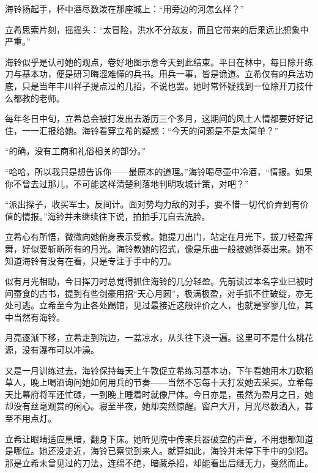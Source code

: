 \documentclass{article}
\begin{document}
海铃扬起手，杯中酒尽数泼在那座城上：“用旁边的河怎么样？”



立希思索片刻，摇摇头：“太冒险，洪水不分敌友，而且它带来的后果远比想象中严重。”



海铃似乎是认可她的观点，卷好地图示意今天到此结束。平日在林中，每日除开练刀与基本功，便是研习晦涩难懂的兵书。用兵一事，皆是诡道。立希仅有的兵法功底，只是当年丰川祥子提点过的几招，不说也罢。她时常怀疑找到一位除开刀技什么都教的老师。



每年冬日中旬，立希总会被打发出去游历三个多月，这期间的风土人情都要好好记住，一一汇报给她。海铃看穿立希的疑惑：“今天的问题是不是太简单？”



“的确，没有工商和礼俗相关的部分。”



“哈哈，所以我只是想告诉你——最原本的道理。”海铃喝尽壶中冷酒，“情报。如果你不曾去过那儿，不可能这样清楚利落地判明攻城计策，对吧？”



“派出探子，收买军士，反间计。面对势均力敌的对手，要不惜一切代价弄到有价值的情报。”海铃并未继续往下说，拍拍手兀自去洗脸。



立希心有所悟，微微向她俯身表示受教。她提刀出门，站定在月光下，拔刀轻盈挥舞，好似要斩断所有的月光。海铃教她的招式，像是乐曲一般被她弹奏出来。她不知道海铃有没有在看，只是专注于手中的刀。



似有月光相助，今日挥刀时总觉得抓住海铃的几分轻盈。先前读过本名字业已被时间蚕食的古书，提到有些剑豪用招“天心月圆”，极满极盈，对手抓不住破绽，亦无处可逃。立希至今为止各处踢馆，见过最接近这般评价之人，也就是寥寥几位，其中当然有海铃。



月亮逐渐下移，立希走到院边，一盆凉水，从头往下浇一遍。这里可不是什么桃花源，没有瀑布可以冲澡。



又是一月训练过去，海铃保持每天上午敦促立希练习基本功，下午看她用木刀砍稻草人，晚上喝酒询问她如何用兵的节奏——当然不忘每十天打发她去采买。立希每天比幕府将军还忙碌，一到晚上睡着时就像尸体。今日亦是，虽然为盈月之日，她却没有丝毫观赏的闲心。寝至半夜，她却突然惊醒。窗户大开，月光尽数洒入，甚至不用点灯。



立希让眼睛适应黑暗，翻身下床。她听见院中传来兵器破空的声音，不用想都知道是哪位。她还没走近，海铃已察觉到来人。就算如此，海铃并未停下手中的剑招。那是立希未曾见过的刀法，连绵不绝，暗藏杀招，却能看出后继无力，戛然而止。
\end{document}
